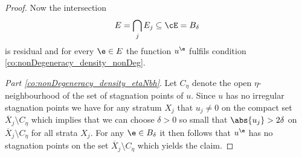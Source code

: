 \begin{proof}
  
  
  Now the intersection
  \begin{align*}
    E=\bigcap_j E_j\subseteq \cE =B_\delta
  \end{align*}
  is residual and
  for every $\e\in E$ the function $u^\e$ fulfils condition
  \ref{co:nonDegeneracy_density_nonDeg}.

  \emph{Part \ref{co:nonDegeneracy_density_etaNbh}}. 
  Let $C_\eta$ denote the open $\eta$-neighbourhood of the set of stagnation points of $u$.
  Since $u$ has no irregular stagnation points we have for any stratum $X_j$ that
  $u_j\neq0$ on the compact set $\overline{X}_j\setminus C_\eta$ which implies that we can choose $\delta>0$ 
  so small that $\abs{u_j}>2\delta$ on $\overline{X}_j\setminus C_\eta$
  for all strata $X_j$.
  For any $\e\in B_\delta$ it then follows that $u^\e$ has no stagnation points on the set $\overline{X}_j\setminus C_\eta$
  which yields the claim.


\end{proof}
